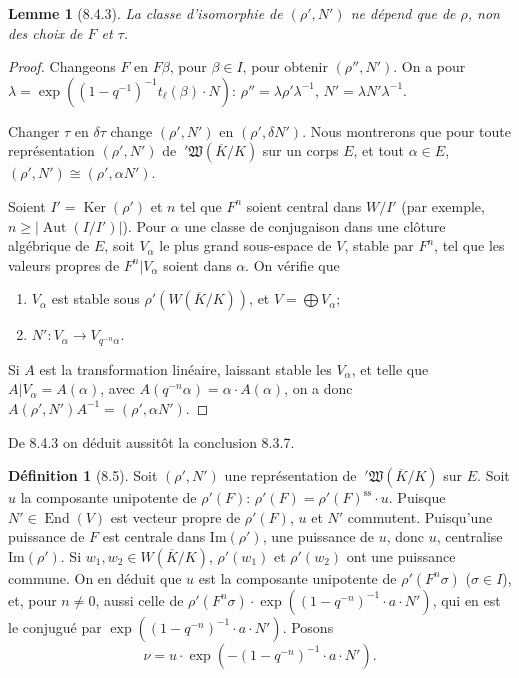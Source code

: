\documentclass[11pt]{amsart}
\theoremstyle{plain}
\newtheorem{lemma}[theorem]{Lemme}
\theoremstyle{definition}
\newtheorem{definition}[theorem]{D\'efinition}
\DeclareMathOperator{\End}{End}
\DeclareMathOperator{\Aut}{Aut}
\DeclareMathOperator{\Ker}{Ker}
\begin{document}
\begin{lemma}[8.4.3]
La classe d'isomorphie de $(\rho',N')$ ne d\'epend que de $\rho$, non des choix de $F$ et $\tau$.
\end{lemma}

\begin{proof}
Changeons $F$ en $F\beta$, pour $\beta \in I$, pour obtenir $(\rho'',N')$. On a pour $\lambda = \exp((1-q^{-1})^{-1} t_\ell(\beta) \cdot N)$: $\rho'' = \lambda \rho' \lambda^{-1}$, $N' = \lambda N' \lambda^{-1}$.

Changer $\tau$ en $\delta\tau$ change $(\rho',N')$ en $(\rho',\delta N')$. Nous montrerons que pour toute repr\'esentation $(\rho',N')$ de $\ '\mathfrak{W}(\overline{K}/K)$ sur un corps $E$, et tout $\alpha \in E$, $(\rho',N') \cong (\rho',\alpha N')$.

Soient $I' = \Ker(\rho')$ et $n$ tel que $F^n$ soient central dans $W/I'$ (par exemple, $n \geq |\Aut(I/I')|$). Pour $\alpha$ une classe de conjugaison dans une cl\^oture alg\'ebrique de $E$, soit $V_\alpha$ le plus grand sous-espace de $V$, stable par $F^n$, tel que les valeurs propres de $F^n|V_\alpha$ soient dans $\alpha$. On v\'erifie que
\begin{enumerate}
\item[(a)] $V_\alpha$ est stable sous $\rho'(W(\overline{K}/K))$, et $V = \bigoplus V_\alpha$;
\item[(b)] $N': V_\alpha \to V_{q^{-n}\alpha}$.
\end{enumerate}
Si $A$ est la transformation lin\'eaire, laissant stable les $V_\alpha$, et telle que $A|V_\alpha = A(\alpha)$, avec $A(q^{-n}\alpha) = \alpha \cdot A(\alpha)$, on a donc $A(\rho',N')A^{-1} = (\rho',\alpha N')$.
\end{proof}

De 8.4.3 on d\'eduit aussit\^ot la conclusion 8.3.7.

\begin{definition}[8.5]
Soit $(\rho',N')$ une repr\'esentation de $\ '\mathfrak{W}(\overline{K}/K)$ sur $E$. Soit $u$ la composante unipotente de $\rho'(F)$: $\rho'(F) = \rho'(F)^{\mathrm{ss}} \cdot u$. Puisque $N' \in \End(V)$ est vecteur propre de $\rho'(F)$, $u$ et $N'$ commutent. Puisqu'une puissance de $F$ est centrale dans $\mathrm{Im}(\rho')$, une puissance de $u$, donc $u$, centralise $\mathrm{Im}(\rho')$. Si $w_1, w_2 \in W(\overline{K}/K)$, $\rho'(w_1)$ et $\rho'(w_2)$ ont une puissance commune. On en d\'eduit que $u$ est la composante unipotente de $\rho'(F^n\sigma)$ ($\sigma \in I$), et, pour $n \not= 0$, aussi celle de $\rho'(F^n\sigma) \cdot \exp((1-q^{-n})^{-1} \cdot a \cdot N')$, qui en est le conjugu\'e par $\exp((1-q^{-n})^{-1} \cdot a \cdot N')$. Posons
\begin{equation}
\nu = u \cdot \exp(-(1-q^{-n})^{-1} \cdot a \cdot N').
\tag{8.5.1}
\end{equation}
\end{definition}
\end{document}
